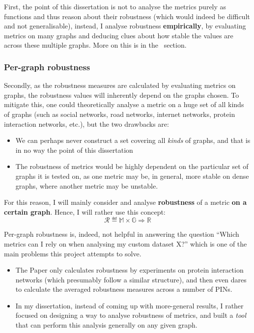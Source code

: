 First, the point of this dissertation is not to analyse the metrics purely as functions and thus reason about their robustness (which would indeed be difficult and not generalisable), instead, I analyse robustness \textbf{empirically}, by evaluating metrics on many graphs and deducing clues about how stable the values are across these multiple graphs.
More on this is in the~ section.

\subsubsection*{Per-graph robustness}

Secondly, as the robustness measures are calculated by evaluating metrics on graphs, the robustness values will inherently depend on the graphs chosen.
To mitigate this, one could theoretically analyse a metric on a huge set of all kinds of graphs (such as social networks, road networks, internet networks, protein interaction networks, etc.), but the two drawbacks are:
\begin{itemize}
    \item We can perhaps never construct a set covering all \textsl{kinds} of graphs, and that is in no way the point of this dissertation
    \item The robustness of metrics would be highly dependent on the particular set of graphs it is tested on, as one metric may be, in general, more stable on dense graphs, where another metric may be unstable.
\end{itemize}

For this reason, I will mainly consider and analyse \textbf{robustness} of a metric \textbf{on a certain graph}.
Hence, I will rather use this concept:
\begin{equation}
    \mathcal{R} \eqdef \mathbb{M} \times \mathbb{G} \Rightarrow \mathbb{R}
\end{equation}

Per-graph robustness is, indeed, not helpful in answering the question ``Which metrics can I rely on when analysing my custom dataset X?'' which is one of the main problems this project attempts to solve.
\begin{itemize}
    \item The Paper only calculates robustness by experiments on protein interaction networks (which presumably follow a similar structure), and then even dares to calculate the averaged robustness measures across a number of PINs.
    \item In my dissertation, instead of coming up with more-general results, I rather focused on designing a way to analyse robustness of metrics, and built a \textsl{tool} that can perform this analysis generally on any given graph.
\end{itemize}


